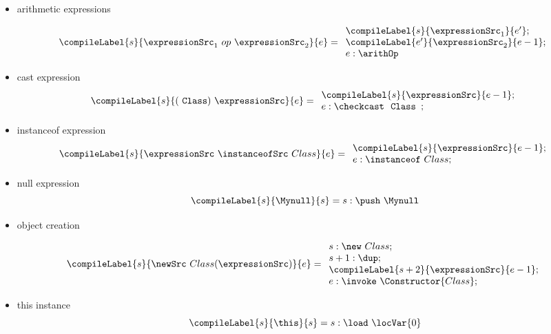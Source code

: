 \begin{itemize}
                
   \item arithmetic expressions
     
     $$\compileLabel{s}{ \expressionSrc_1 \ op \ \expressionSrc_2 }{e} = 
                 \begin{array}{l}
                       \compileLabel{s}{ \expressionSrc_1}{  e'  } ; \\
                       \compileLabel{e'}{ \expressionSrc_2}{ e - 1  }; \\
                       e:\arithOp
                 \end{array}     
                $$ 
                       

   \item cast expression 
     $$ \compileLabel{s}{ (\mbox{ \rm \texttt{Class}}   ) \ \expressionSrc }{e} = 
              \begin{array}{l}  
                 \compileLabel{s}{\expressionSrc}{e  - 1};\\
                  e : \checkcast \ \mbox{ \rm \texttt{Class }} ;
              \end{array}
$$
	      

  \item instanceof expression
    $$ \compileLabel{s}{\expressionSrc \ \instanceofSrc \ Class }{e} = 
         \begin{array}{l}
              \compileLabel{s}{\expressionSrc}{ e  -1 };\\
               e : \instanceof \ Class;
         \end{array} $$

  \item null expression
    $$ \compileLabel{s}{\Mynull }{s } = s: \push \ \Mynull$$
          
 
 \item object creation
    
   $$\compileLabel{s}{ \newSrc \ Class (\expressionSrc ) }{e} =
                 \begin{array}{l}
                       s :    \new \ Class; \\ 
		       s + 1: \dup; \\
		       \compileLabel{s+2}{\expressionSrc}{e - 1 };\\
	               
		       e : \invoke \ \Constructor{Class};     
	       \end{array}$$
 		        
\item this instance
  $$\compileLabel{s}{\this}{s } = s:  \load \ \locVar{0}$$
              	              
\end{itemize}


